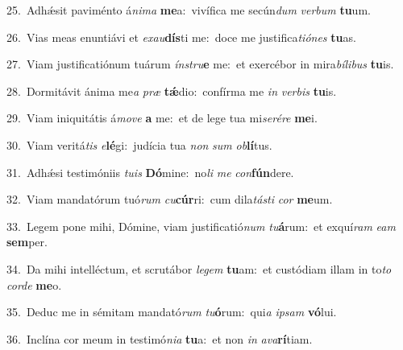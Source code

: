 {\numbfont\textcolor{\numbcolor}{25.}}~Adhǽsit paviménto á\-\textit{ni}\-\textit{ma} \textbf{me}\-a:~\star vivífica me secún\textit{dum} \textit{ver}\-\textit{bum} \textbf{tu}\-um.\par
{\numbfont\textcolor{\numbcolor}{26.}}~Vias meas enuntiávi et \textit{ex}\-\textit{au}\textbf{dís}ti me:~\star doce me justifica\-\textit{ti}\-\textit{ó}\textit{nes} \textbf{tu}\-as.\par
{\numbfont\textcolor{\numbcolor}{27.}}~Viam justificatiónum tuárum \textit{ín}\-\textit{stru}\textbf{e} me:~\star et exercébor in mira\-\textit{bí}\-\textit{li}\textit{bus} \textbf{tu}\-is.\par
{\numbfont\textcolor{\numbcolor}{28.}}~Dormitávit ánima me\textit{a} \textit{præ} \textbf{tǽ}\-dio:~\star confírma me \textit{in} \textit{ver}\-\textit{bis} \textbf{tu}\-is.\par
{\numbfont\textcolor{\numbcolor}{29.}}~Viam iniquitátis á\-\textit{mo}\-\textit{ve} \textbf{a} me:~\star et de lege tua mi\-\textit{se}\-\textit{ré}\textit{re} \textbf{me}\-i.\par
{\numbfont\textcolor{\numbcolor}{30.}}~Viam veritá\textit{tis} \textit{e}\-\textbf{lé}gi:~\star judícia tua \textit{non} \textit{sum} \textit{ob}\-\textbf{lí}tus.\par
{\numbfont\textcolor{\numbcolor}{31.}}~Adhǽsi testimóniis \textit{tu}\-\textit{is} \textbf{Dó}\-mine:~\star no\textit{li} \textit{me} \textit{con}\-\textbf{fún}dere.\par
{\numbfont\textcolor{\numbcolor}{32.}}~Viam mandatórum tuó\textit{rum} \textit{cu}\-\textbf{cúr}ri:~\star cum dila\-\textit{tás}\-\textit{ti} \textit{cor} \textbf{me}\-um.\par
{\numbfont\textcolor{\numbcolor}{33.}}~Legem pone mihi, Dómine, viam justificatió\textit{num} \textit{tu}\-\textbf{á}rum:~\star et exquí\textit{ram} \textit{e}\-\textit{am} \textbf{sem}\-per.\par
{\numbfont\textcolor{\numbcolor}{34.}}~Da mihi intelléctum, et scrutábor \textit{le}\-\textit{gem} \textbf{tu}\-am:~\star et custódiam illam in to\textit{to} \textit{cor}\-\textit{de} \textbf{me}\-o.\par
{\numbfont\textcolor{\numbcolor}{35.}}~Deduc me in sémitam mandató\textit{rum} \textit{tu}\-\textbf{ó}rum:~\star qui\textit{a} \textit{ip}\-\textit{sam} \textbf{vó}\-lui.\par
{\numbfont\textcolor{\numbcolor}{36.}}~Inclína cor meum in testimó\-\textit{ni}\-\textit{a} \textbf{tu}\-a:~\star et non \textit{in} \textit{a}\-\textit{va}\textbf{rí}tiam.\par
